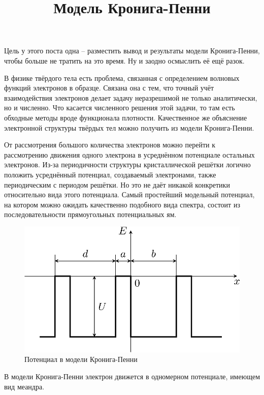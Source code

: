 \documentclass{ncc}
\title{Модель Кронига-Пенни}
\begin{document}
\maketitle

Цель у этого поста одна -- разместить вывод и результаты модели Кронига-Пенни, чтобы больше не тратить на это время. Ну и заодно осмыслить её ещё разок.

В физике твёрдого тела есть проблема, связанная с определением волновых функций электронов в образце. Связана она с тем, что точный учёт взаимодействия электронов делает задачу неразрешимой не только аналитически, но и численно. Что касается численного решения этой задачи, то там есть обходные методы вроде функционала плотности. Качественное же объяснение электронной структуры твёрдых тел можно получить из модели Кронига-Пенни.

От рассмотрения большого количества электронов можно перейти к рассмотрению движения одного электрона в усреднённом потенциале остальных электронов. Из-за периодичности структуры кристаллической решётки логично положить усреднённый потенциал, создаваемый электронами, также периодическим с периодом решётки. Но это не даёт никакой конкретики относительно вида этого потенциала. Самый простейший модельный потенциал, на котором можно ожидать качественно подобного вида спектра, состоит из последовательности прямоугольных потенциальных ям.

\begin{figure}[h!]
    \center
    \includegraphics[width=.5\textwidth]{2015-11-09-kronig-penney-potential.png}
    \caption{Потенциал в модели Кронига-Пенни}
\end{figure}

В модели Кронига-Пенни электрон движется в одномерном потенциале, имеющем вид меандра.
\end{document}
